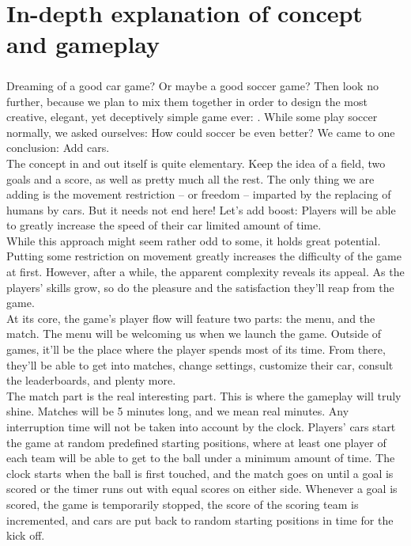 \chapter{In-depth explanation of concept and gameplay}

\paragraph{}Dreaming of a good car game? Or maybe a good soccer game? Then look no further, because we plan to mix them together in order to design the most creative, elegant, yet deceptively simple game ever: \FR. While some play soccer normally, we asked ourselves: How could soccer be even better? We came to one conclusion: Add cars.\\

The concept in and out itself is quite elementary. Keep the idea of a field, two goals and a score, as well as pretty much all the rest. The only thing we are adding is the movement restriction – or freedom – imparted by the replacing of humans by cars. But it needs not end here! Let’s add boost: Players will be able to greatly increase the speed of their car limited amount of time.\\

While this approach might seem rather odd to some, it holds great potential. Putting some restriction on movement greatly increases the difficulty of the game at first. However, after a while, the apparent complexity reveals its appeal. As the players’ skills grow, so do the pleasure and the satisfaction they’ll reap from the game.\\

At its core, the game’s player flow will feature two parts: the menu, and the match. The menu will be welcoming us when we launch the game. Outside of games, it’ll be the place where the player spends most of its time. From there, they’ll be able to get into matches, change settings, customize their car, consult the leaderboards, and plenty more.\\

The match part is the real interesting part. This is where the gameplay will truly shine. Matches will be 5 minutes long, and we mean real minutes. Any interruption time will not be taken into account by the clock. Players’ cars start the game at random predefined starting positions, where at least one player of each team will be able to get to the ball under a minimum amount of time. The clock starts when the ball is first touched, and the match goes on until a goal is scored or the timer runs out with equal scores on either side. Whenever a goal is scored, the game is temporarily stopped, the score of the scoring team is incremented, and cars are put back to random starting positions in time for the kick off.\\

